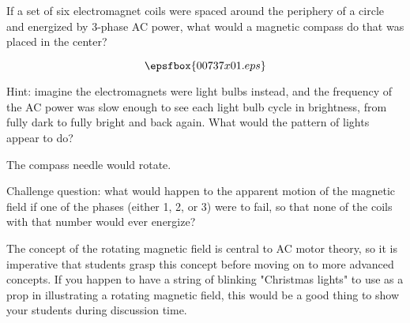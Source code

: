 

If a set of six electromagnet coils were spaced around the periphery of a circle and energized by 3-phase AC power, what would a magnetic compass do that was placed in the center?  

$$\epsfbox{00737x01.eps}$$

Hint: imagine the electromagnets were light bulbs instead, and the frequency of the AC power was slow enough to see each light bulb cycle in brightness, from fully dark to fully bright and back again.  What would the pattern of lights appear to do?







The compass needle would rotate.

\vskip 10pt

Challenge question: what would happen to the apparent motion of the magnetic field if one of the phases (either 1, 2, or 3) were to fail, so that none of the coils with that number would ever energize?







The concept of the rotating magnetic field is central to AC motor theory, so it is imperative that students grasp this concept before moving on to more advanced concepts.  If you happen to have a string of blinking "Christmas lights" to use as a prop in illustrating a rotating magnetic field, this would be a good thing to show your students during discussion time.




